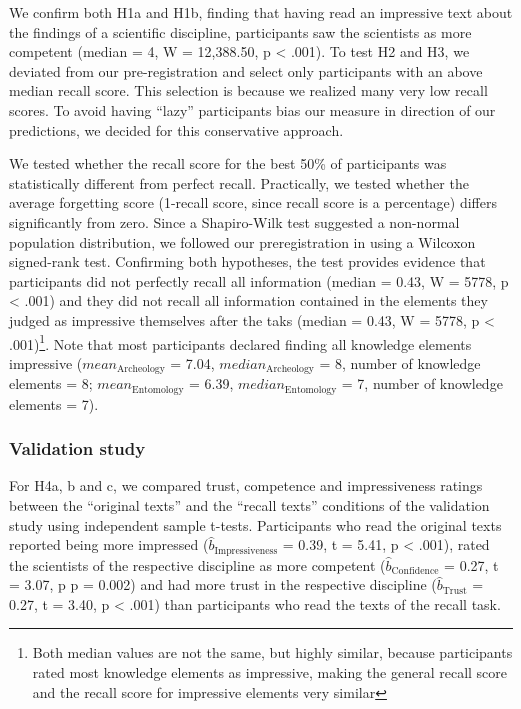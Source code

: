 \documentclass[
  doc,floatsintext]{apa6}
\begin{document}
We confirm both H1a and H1b, finding that having read an impressive text about the findings of a scientific discipline, participants saw the scientists as more competent (median = 4, W = 12,388.50, p \textless{} .001). To test H2 and H3, we deviated from our pre-registration and select only participants with an above median recall score. This selection is because we realized many very low recall scores. To avoid having ``lazy'' participants bias our measure in direction of our predictions, we decided for this conservative approach.

We tested whether the recall score for the best 50\% of participants was statistically different from perfect recall. Practically, we tested whether the average forgetting score (1-recall score, since recall score is a percentage) differs significantly from zero. Since a Shapiro-Wilk test suggested a non-normal population distribution, we followed our preregistration in using a Wilcoxon signed-rank test. Confirming both hypotheses, the test provides evidence that participants did not perfectly recall all information (median = 0.43, W = 5778, p \textless{} .001) and they did not recall all information contained in the elements they judged as impressive themselves after the taks (median = 0.43, W = 5778, p \textless{} .001)\footnote{Both median values are not the same, but highly similar, because participants rated most knowledge elements as impressive, making the general recall score and the recall score for impressive elements very similar}. Note that most participants declared finding all knowledge elements impressive (\(mean_{\text{Archeology}}\) = 7.04, \(median_{\text{Archeology}}\) = 8, number of knowledge elements = 8; \(mean_{\text{Entomology}}\) = 6.39, \(median_{\text{Entomology}}\) = 7, number of knowledge elements = 7).

\subsubsection{Validation study}\label{validation-study-1}

For H4a, b and c, we compared trust, competence and impressiveness ratings between the ``original texts'' and the ``recall texts'' conditions of the validation study using independent sample t-tests. Participants who read the original texts reported being more impressed (\(\hat{b}_{\text{Impressiveness}}\) = 0.39, t = 5.41, p \textless{} .001), rated the scientists of the respective discipline as more competent (\(\hat{b}_{\text{Confidence}}\) = 0.27, t = 3.07, p p = 0.002) and had more trust in the respective discipline (\(\hat{b}_{\text{Trust}}\) = 0.27, t = 3.40, p \textless{} .001) than participants who read the texts of the recall task.
\end{document}
